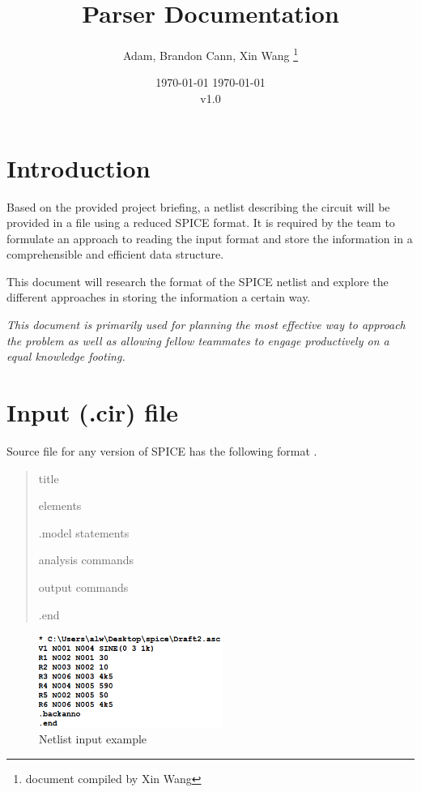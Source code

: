 \documentclass[a4paper, titlepage]{article}
\title{Parser Documentation}
\author{Adam, Brandon Cann, Xin Wang \thanks{document compiled by Xin Wang}}
\date \today
\date{ \today \\ v1.0}
\begin{document}
    \maketitle
    
    \tableofcontents
    \pagebreak
 
    \section{Introduction}
    \indent
    Based on the provided project briefing, a netlist describing the circuit will be provided in a file 
    using a reduced SPICE format. It is required by the team to formulate an approach to reading the input format and 
    store the information in a comprehensible and efficient data structure. 
    \par
    This document will research the format of the SPICE netlist and explore the different approaches in 
    storing the information a certain way. 
    \par
    \begin{center}
        \textit{This document is primarily used for planning the most effective 
        way to approach the problem as well as allowing fellow teammates to 
        engage productively on a equal knowledge footing.}
    \end{center}
    \section{Input (.cir) file}
    Source file for any version of SPICE has the following format \cite{spice}.
    \begin{quotation}
        {\selectfont
            title \par
            elements \par
            .model statements \par
            analysis commands \par
            output commands \par
            .end \par
        }
    \end{quotation}

    \begin{figure}[h]
        \centering
        \includegraphics[width=60mm,scale=1]{spice netlist example}
        \caption{Netlist input example}
        \label{fig:Netlist input example}
    \end{figure}
\end{document}
